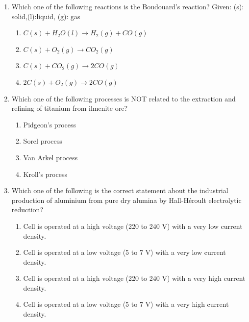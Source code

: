 \documentclass[journal]{IEEEtran}
\theoremstyle{remark}
\begin{document}
\begin{enumerate}[resume]
\item Which one of the following reactions is the Boudouard's reaction? Given: (s): solid,(l):liquid, (g): gas \hfill{}
\begin{enumerate}
\item $C(s) + H_2O(l) \rightarrow H_2(g) + CO(g)$
\item $C(s) + O_2(g) \rightarrow CO_2(g)$
\item $C(s) + CO_2(g) \rightarrow 2CO(g)$
\item $2C(s) + O_2(g) \rightarrow 2CO(g)$
\end{enumerate}

\item Which one of the following processes is NOT related to the extraction and refining of titanium from ilmenite ore? \hfill{}
\begin{multicols}{2}
\begin{enumerate}
\item Pidgeon's process
\item Sorel process
\item Van Arkel process
\item Kroll's process
\end{enumerate}
\end{multicols}

\item Which one of the following is the correct statement about the industrial production of aluminium from pure dry alumina by Hall-Héroult electrolytic reduction? \hfill{}
\begin{enumerate}
\item Cell is operated at a high voltage (220 to 240 V) with a very low current density.
\item Cell is operated at a low voltage (5 to 7 V) with a very low current density.
\item Cell is operated at a high voltage (220 to 240 V) with a very high current density.
\item Cell is operated at a low voltage (5 to 7 V) with a very high current density.
\end{enumerate}


\end{enumerate}
\end{document}
